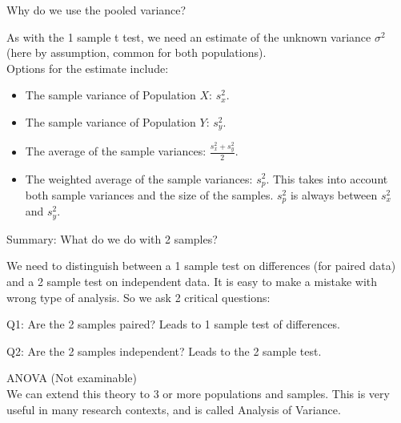 \documentclass[t,xcolor=pdftex,dvipsnames,table]{beamer}
\begin{document}
\begin{frame}{Why do we use the pooled variance? }

As with the 1 sample t test, we need an estimate of the unknown variance $\sigma^2$ (here by assumption, common for both populations). \\

Options for the estimate include:

\begin{itemize}
\item The sample variance of Population $X$: $s_{x}^2$.
\item The sample variance of Population $Y$: $s_{y}^2$.
\item The average of the sample variances: $\frac{s_{x}^2 + s_{y}^2}{2}$.
\item The weighted average of the sample variances: $s_{p}^2$. This takes into account both sample variances and the size of the samples. $s_{p}^2$ is always between $s_{x}^2$ and $s_{y}^2$.
\end{itemize}





\end{frame}





\begin{frame}{Summary: What do we do with 2 samples? }

We need to distinguish between a 1 sample test on differences (for paired data) and a 2 sample test on independent data. It is easy to make a mistake with wrong type of analysis. So we ask 2 critical questions:

\vspace{.5cm}
Q1: Are the 2 samples paired? Leads to 1 sample test of differences. \\
\vspace{.5cm}

Q2: Are the 2 samples independent? Leads to the 2 sample test.

\vspace{.5cm}
ANOVA (Not examinable) \\
We can extend this theory to 3 or more populations and samples. This is very useful in many research contexts, and is called Analysis of Variance.
\end{frame}
\end{document}
